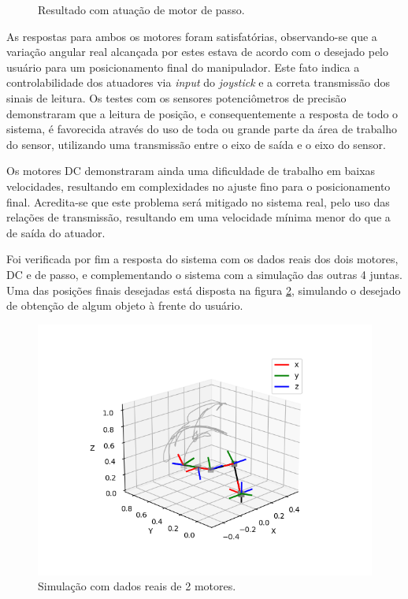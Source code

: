 \begin{figure}[h!]
\begin{centering}
\begin{floatrow}
    \end{floatrow}

\caption{Resultado com atuação de motor de passo.}
\label{fig:result-dc}

\par\end{centering}
\end{figure}

As respostas para ambos os motores foram satisfatórias, observando-se que a variação angular real alcançada
por estes estava de acordo com o desejado pelo usuário para um posicionamento final do manipulador. 
Este fato indica a controlabilidade dos atuadores via \textit{input} do \textit{joystick} e a correta 
transmissão dos sinais de leitura. 
Os testes com os sensores potenciômetros de precisão demonstraram que a leitura de posição, 
e consequentemente a resposta de todo o sistema, é favorecida através do uso de toda ou grande
parte da área de trabalho do sensor, utilizando uma transmissão entre o eixo de saída e o eixo
do sensor. 

Os motores DC demonstraram ainda uma dificuldade de trabalho em baixas velocidades, resultando em
complexidades no ajuste fino para o posicionamento final. Acredita-se que este problema será mitigado
no sistema real, pelo uso das relações de transmissão, resultando em uma velocidade mínima menor do que 
a de saída do atuador.

Foi verificada por fim a resposta do sistema com os dados reais dos dois motores, DC e de passo, e complementando
o sistema com a simulação das outras 4 juntas. Uma das posições finais desejadas está disposta na figura 
\ref{fig:pos-dois}, simulando o desejado de obtenção de algum objeto à frente do usuário.

\begin{figure}[h!]
    \begin{centering}

    \includegraphics[width=0.8\columnwidth]{images/resultados/pos-dois.png}

\caption{Simulação com dados reais de 2 motores.}
\label{fig:pos-dois}

\par\end{centering}
\end{figure}

